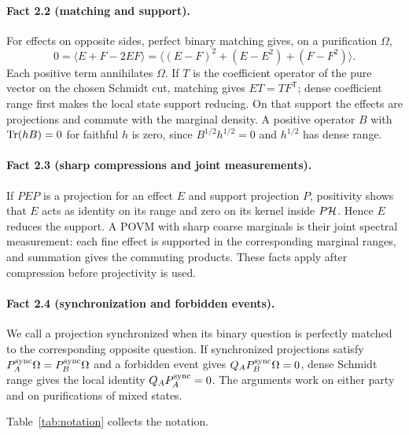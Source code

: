 \paragraph{Fact 2.2 (matching and support).}
For effects on opposite sides, perfect binary matching gives, on a purification $\Omega$,
\[
 0=\langle E+F-2EF\rangle
 =\langle(E-F)^2+(E-E^2)+(F-F^2)\rangle.
\]
Each positive term annihilates $\Omega$. If $T$ is the coefficient operator of the pure vector on the chosen Schmidt cut, matching gives $ET=T F^{\mathsf T}$; dense coefficient range first makes the local state support reducing. On that support the effects are projections and commute with the marginal density. A positive operator $B$ with $\operatorname{Tr}(hB)=0$ for faithful $h$ is zero, since $B^{1/2}h^{1/2}=0$ and $h^{1/2}$ has dense range.

\paragraph{Fact 2.3 (sharp compressions and joint measurements).}
If $PEP$ is a projection for an effect $E$ and support projection $P$, positivity shows that $E$ acts as identity on its range and zero on its kernel inside $P\mathcal H$. Hence $E$ reduces the support. A POVM with sharp coarse marginals is their joint spectral measurement: each fine effect is supported in the corresponding marginal ranges, and summation gives the commuting products. These facts apply after compression before projectivity is used.

\paragraph{Fact 2.4 (synchronization and forbidden events).}
We call a projection synchronized when its binary question is perfectly matched to the corresponding opposite question. If synchronized projections satisfy $P_A^{\rm sync}\Omega=P_B^{\rm sync}\Omega$ and a forbidden event gives $Q_AP_B^{\rm sync}\Omega=0$, dense Schmidt range gives the local identity $Q_AP_A^{\rm sync}=0$. The arguments work on either party and on purifications of mixed states.

Table~\ref{tab:notation} collects the notation.

